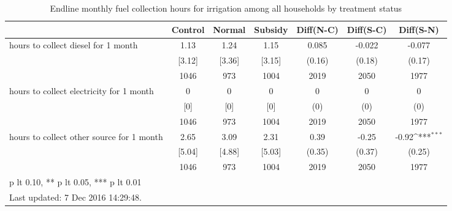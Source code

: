 \begin{table}[htbp]\centering
\def\sym#1{\ifmmode^{#1}\else\(^{#1}\)\fi}
\caption{Endline monthly fuel collection hours for irrigation among all households by treatment status \label{tab:"balance"}}
\begin{tabular*}{1\hsize}{@{\hskip\tabcolsep\extracolsep\fill}l*{1}{cccccc}}
\toprule
                                &  Control&   Normal&  Subsidy&Diff(N-C)         &Diff(S-C)         &Diff(S-N)         \\
\midrule
hours to collect diesel for 1 month&     1.13&     1.24&     1.15&    0.085         &   -0.022         &   -0.077         \\
                                &   [3.12]&   [3.36]&   [3.15]&   (0.16)         &   (0.18)         &   (0.17)         \\
                                &     1046&      973&     1004&     2019         &     2050         &     1977         \\
hours to collect electricity for 1 month&        0&        0&        0&        0         &        0         &        0         \\
                                &      [0]&      [0]&      [0]&      (0)         &      (0)         &      (0)         \\
                                &     1046&      973&     1004&     2019         &     2050         &     1977         \\
hours to collect other source for 1 month&     2.65&     3.09&     2.31&     0.39         &    -0.25         &    -0.92\sym{***}\\
                                &   [5.04]&   [4.88]&   [5.03]&   (0.35)         &   (0.37)         &   (0.25)         \\
                                &     1046&      973&     1004&     2019         &     2050         &     1977         \\
\bottomrule
\multicolumn{7}{l}{\footnotesize * p lt 0.10, ** p lt 0.05, *** p lt 0.01}\\
\multicolumn{7}{l}{\footnotesize Last updated:  7 Dec 2016 14:29:48.}\\
\end{tabular*}
\end{table}
